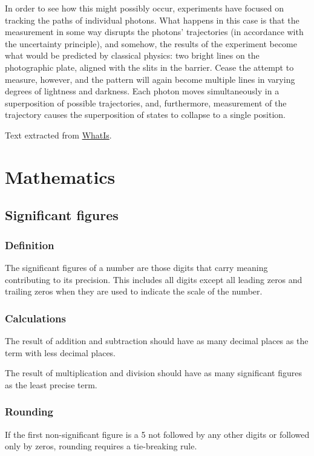\documentclass[oneside]{book}
\begin{document}
In order to see how this might possibly occur, experiments have focused on
tracking the paths of individual photons. What happens in this case is that the
measurement in some way disrupts the photons' trajectories (in accordance with
the uncertainty principle), and somehow, the results of the experiment become
what would be predicted by classical physics: two bright lines on the
photographic plate, aligned with the slits in the barrier. Cease the attempt to
measure, however, and the pattern will again become multiple lines in varying
degrees of lightness and darkness. Each photon moves simultaneously in a
superposition of possible trajectories, and, furthermore, measurement of the
trajectory causes the superposition of states to collapse to a single position.

Text extracted from
\href{http://whatis.techtarget.com/definition/superposition}{WhatIs}.

\part{Mathematics}

\chapter{Significant figures}

\section{Definition}
The significant figures of a number are those digits that carry meaning
contributing to its precision. This includes all digits except all leading zeros
and trailing zeros when they are used to indicate the scale of the number.

\section{Calculations}
The result of addition and subtraction should have as many decimal places as the
term with less decimal places.

The result of multiplication and division should have as many significant
figures as the least precise term.

\section{Rounding}
If the first non-significant figure is a 5 not followed by any other digits or
followed only by zeros, rounding requires a tie-breaking rule.
\end{document}
